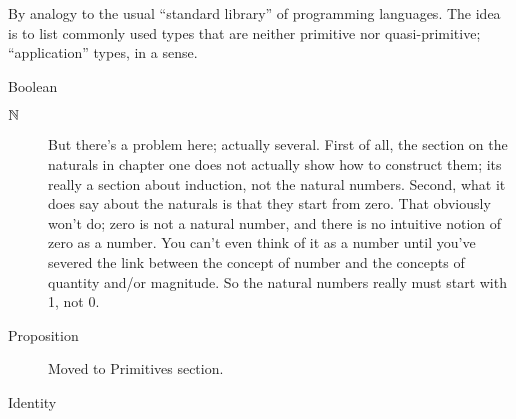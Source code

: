 \begin{ednote}
  By analogy to the usual ``standard library'' of programming
  languages.  The idea is to list commonly used types that are neither
  primitive nor quasi-primitive; ``application'' types, in a sense.
\end{ednote}


\begin{description}
\item [Boolean] \citep[p. 34]{hottbook}
\item [$\mathbb{N}$] \citep[p. 36]{hottbook} But there's a problem here;
  actually several.  First of all, the section on the naturals in
  chapter one does not actually show how to construct them; its really
  a section about induction, not the natural numbers.  Second, what it
  does say about the naturals is that they start from zero.  That
  obviously won't do; zero is not a natural number, and there is no
  intuitive notion of zero as a number.  You can't even think of it as
  a number until you've severed the link between the concept of number
  and the concepts of quantity and/or magnitude.  So the natural
  numbers really must start with 1, not 0.
\item [Proposition]  Moved to Primitives section.
\item [Identity]
\end{description}

